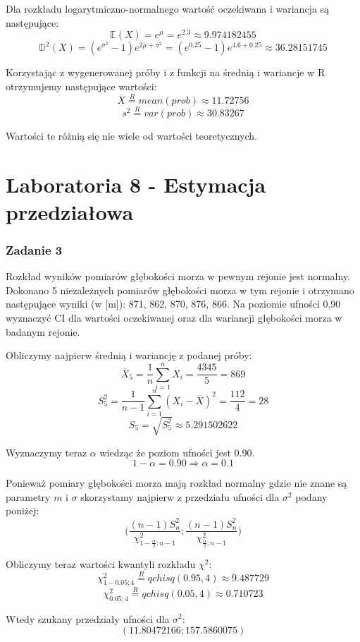 \documentclass{article}
\begin{document}
Dla rozkładu logarytmiczno-normalnego wartość oczekiwana i wariancja są następujące:
\[ \mathbb{E}(X) = e^\mu = e^2.3 \approx 9.974182455 \]
\[ \mathbb{D}^2(X) = (e^{\sigma^2} - 1)e^{2\mu+\sigma^2} = (e^{0.25}-1)e^{4.6 + 0.25} \approx 36.28151745 \]

Korzystając z wygenerowanej próby i z funkcji na średnią i wariancje w R otrzymujemy następujące wartości:
\[ \overline{X} \overset{R}{=} mean(prob) \approx 11.72756 \]
\[ s^2 \overset{R}{=} var(prob) \approx 30.83267 \]

Wartości te różnią się nie wiele od wartości teoretycznych.

\newpage
\part{Laboratoria 8 - Estymacja przedziałowa}

\section{Zadanie 3}
Rozkład wyników pomiarów głębokości morza w pewnym rejonie jest normalny. Dokonano 5 niezależnych pomiarów głębokości morza w tym rejonie i otrzymano następujące wyniki (w [m]): 871, 862, 870, 876, 866. Na poziomie ufności 0,90 wyznaczyć CI dla wartości oczekiwanej oraz dla wariancji głębokości morza w badanym rejonie. \\ \par

Obliczymy najpierw średnią i wariancję z podanej próby:
\[ \overline{X}_5 = \frac{1}{n}\sum_{i=1}^n X_i = \frac{4345}{5} = 869 \]
\[ S^2_5 = \frac{1}{n-1}\sum_{i=1}^n (X_i-\overline{X})^2 = \frac{112}{4} = 28 \]
\[ S_5 = \sqrt{S_5^2} \approx 5.291502622 \]

Wyznaczymy teraz $\alpha$ wiedząc że poziom ufności jest 0.90.
\[1-\alpha = 0.90 \Rightarrow \alpha = 0.1 \]

Ponieważ pomiary głębokości morza mają rozkład normalny gdzie nie znane są parametry $m$ i $\sigma$ skorzystamy najpierw z przedziału ufności dla $\sigma^2$ podany poniżej:
\[ \Big( \frac{(n-1)S_n^2}{\chi_{1-\frac{\alpha}{2}; n-1}^2} ; \frac{(n-1)S_n^2}{\chi_{\frac{\alpha}{2}; n-1}^2} \Big) \]

Obliczymy teraz wartości kwantyli rozkładu $\chi^2$:
\[ \chi_{1-0.05; 4}^2 \overset{R}{=} qchisq(0.95, 4) \approx 9.487729 \]
\[ \chi_{0.05; 4}^2 \overset{R}{=} qchisq(0.05, 4) \approx 0.710723 \]

Wtedy szukany przedziały ufności dla $\sigma^2$:
\[ (11.80472166; 157.5860075) \]
\end{document}

